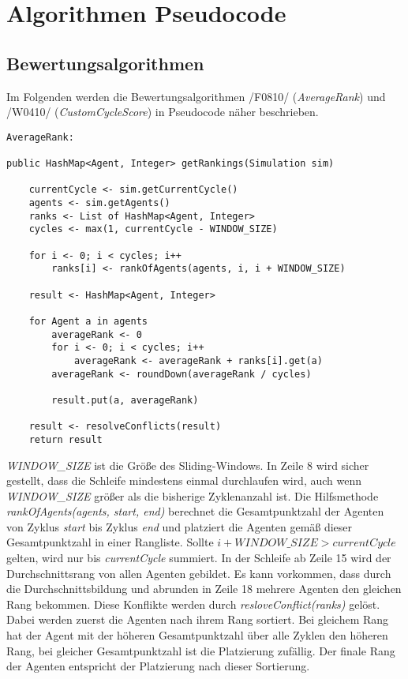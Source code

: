 \chapter{Algorithmen Pseudocode}

\section{Bewertungsalgorithmen}

Im Folgenden werden die Bewertungsalgorithmen /F0810/ (\emph{AverageRank}) und /W0410/ (\emph{CustomCycleScore}) in Pseudocode näher beschrieben. 

\begin{lstlisting}
AverageRank:

public HashMap<Agent, Integer> getRankings(Simulation sim) 
	
	currentCycle <- sim.getCurrentCycle()
	agents <- sim.getAgents()
	ranks <- List of HashMap<Agent, Integer>	
	cycles <- max(1, currentCycle - WINDOW_SIZE)
	
	for i <- 0; i < cycles; i++ 
		ranks[i] <- rankOfAgents(agents, i, i + WINDOW_SIZE)
	
	result <- HashMap<Agent, Integer>	
	
	for Agent a in agents
		averageRank <- 0
		for i <- 0; i < cycles; i++
			averageRank <- averageRank + ranks[i].get(a)
		averageRank <- roundDown(averageRank / cycles)
		
		result.put(a, averageRank)
	
	result <- resolveConflicts(result)
	return result
\end{lstlisting}
\emph{WINDOW\_SIZE} ist die Größe des Sliding-Windows. In Zeile 8 wird sicher gestellt, dass die Schleife mindestens einmal durchlaufen wird, auch wenn \emph{WINDOW\_SIZE} größer als die bisherige Zyklenanzahl ist.
Die Hilfsmethode \emph{rankOfAgents(agents, start, end)} berechnet die Gesamtpunktzahl der Agenten von Zyklus \emph{start} bis Zyklus \emph{end} und platziert die Agenten gemäß dieser Gesamtpunktzahl in einer Rangliste. Sollte $i + WINDOW\_SIZE > currentCycle$ gelten, wird nur bis \emph{currentCycle} summiert. 
In der Schleife ab Zeile 15 wird der Durchschnittsrang von allen Agenten gebildet.
Es kann vorkommen, dass durch die Durchschnittsbildung und abrunden in Zeile 18 mehrere Agenten den gleichen Rang bekommen. Diese Konflikte werden durch \emph{resloveConflict(ranks)} gelöst. Dabei werden zuerst die Agenten nach ihrem Rang sortiert. Bei gleichem Rang hat der Agent mit der höheren Gesamtpunktzahl über alle Zyklen den höheren Rang, bei gleicher Gesamtpunktzahl ist die Platzierung zufällig. Der finale Rang der Agenten entspricht der Platzierung nach dieser Sortierung.

